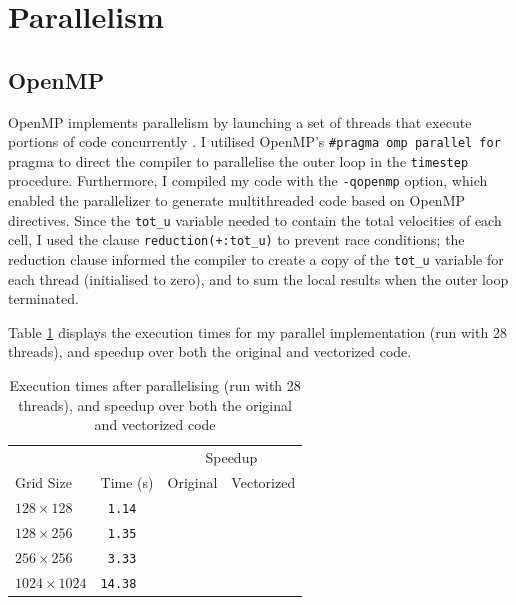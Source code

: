\documentclass[twocolumn, a4paper]{article}
\begin{document}
\section{Parallelism}


\subsection{OpenMP}

OpenMP implements parallelism by launching a set of threads that execute portions of code concurrently \cite{openmp_cornell}.
I utilised OpenMP's \texttt{\#pragma omp parallel for} pragma to direct the compiler to parallelise the outer loop in the \texttt{timestep} procedure.
Furthermore, I compiled my code with the \texttt{-qopenmp} option, which enabled the parallelizer to generate multithreaded code based on OpenMP directives.
Since the \texttt{tot\_u} variable needed to contain the total velocities of each cell, I used the clause \texttt{reduction(+:tot\_u)} to prevent race conditions; the reduction clause informed the compiler to create a copy of the \texttt{tot\_u} variable for each thread (initialised to zero), and to sum the local results when the outer loop terminated.

Table \ref{tab:parallelised} displays the execution times for my parallel implementation (run with 28 threads), and speedup over both the original and vectorized code.

\begin{table}[htbp]
  \begin{center}
  \caption{Execution times after parallelising (run with 28 threads), and speedup over both the original and vectorized code}\label{tab:parallelised}
  \begin{tabular}{l | l  l  l} 
      \hline\hline
      &&\multicolumn{2}{c}{Speedup}\\
      \cline{3-4}
      Grid Size&Time (s)&Original&Vectorized\\
      \hline
      $128 \times 128$&\texttt{ 1.14}&\texttt{}&\texttt{}\\
      $128 \times 256$&\texttt{ 1.35}&\texttt{}&\texttt{}\\
      $256 \times 256$&\texttt{ 3.33}&\texttt{}&\texttt{}\\
      $1024 \times 1024$&\texttt{14.38}&\texttt{}&\texttt{}\\
      \hline
    \end{tabular}
  \end{center}
\end{table}
\end{document}
